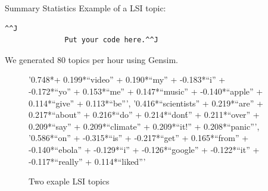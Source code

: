\documentclass[final]{beamer}
\newlength{\sepwid}
\newlength{\onecolwid}
\newlength{\twocolwid}
\begin{document}
\begin{frame}[t]
\begin{columns}[t]
    \begin{column}{\sepwid}\end{column}   %
    \begin{column}{\twocolwid}    %
      \begin{columns}[t,totalwidth=\twocolwid] %
        \begin{column}{\onecolwid}\vspace{-.69in}
          \begin{block}{Summary Statistics}
            Example of a LSI topic:
            \begin{lstlisting}^^J
              Put your code here.^^J
            \end{lstlisting}
            We generated 80 topics per hour using Gensim.
          \begin{figure}
          \begin{center}
            '0.748*+ 0.199*``video'' + 0.190*``my'' + -0.183*``i''
            + -0.172*``yo'' + 0.153*``me'' + 0.147*``music'' +
            -0.140*``apple'' + 0.114*``give'' + 0.113*``be''',
             '0.416*``scientists'' + 0.219*``are'' + 0.217*``about'' +
             0.216*``do'' + 0.214*``don\'t'' + 0.211*``over'' + 0.209*``say'' +
             0.209*``climate'' + 0.209*``it!'' + 0.208*``panic''',
              '0.586*``on'' + -0.315*``is'' + -0.217*``get'' + 0.165*``from''
              + -0.140*``ebola'' + -0.129*``i'' + -0.126*``google'' +
            -0.122*``it'' + -0.117*``really'' + 0.114*``liked'''
            \caption{Two exaple LSI topics}
            \label{fig:autocorrplot}
          \end{center}
        \end{figure}
          \end{block}
        \end{column}

\end{columns}
\end{column}
\end{columns}
\end{frame}
\end{document}
